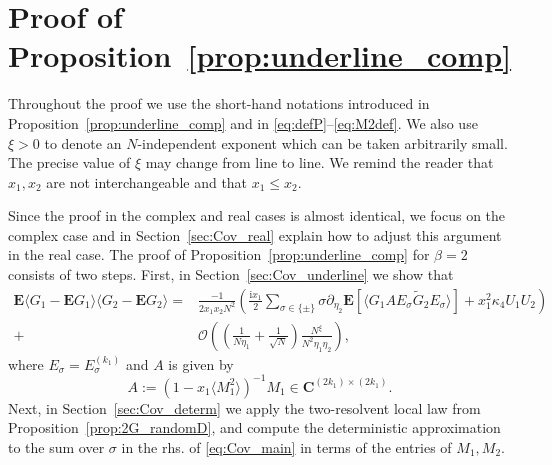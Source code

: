 \documentclass[10pt]{amsart}
\numberwithin{equation}{section}
\newcommand{\E}{\mathbf{E}}
\newcommand{\C}{\mathbf{C}}
\newcommand{\ii}{\mathrm{i}}
\begin{document}
\section{Proof of Proposition~\ref{prop:underline_comp}}
\label{sec:compcov}

Throughout the proof we use the short-hand notations introduced in Proposition~\ref{prop:underline_comp} and in \eqref{eq:defP}--\eqref{eq:M2def}. We also use $\xi>0$ to denote an $N$-independent exponent which can be taken arbitrarily small. The precise value of $\xi$ may change from line to line. We remind the reader that $x_1,x_2$ are not interchangeable and that $x_1\le x_2$.

Since the proof in the complex and real cases is almost identical, we focus on the complex case and in Section~\ref{sec:Cov_real} explain how to adjust this argument in the real case. The proof of Proposition~\ref{prop:underline_comp} for $\beta=2$ consists of two steps. First, in Section~\ref{sec:Cov_underline} we show that
\begin{equation}
\begin{split}
\E \langle G_1-\E G_1\rangle\langle G_2-\E G_2\rangle  = &\frac{-1}{2x_1x_2N^2} \left(\frac{\ii x_1}{2}\sum_{\sigma\in\{\pm\}}\sigma\partial_{\eta_2}\E\left[\langle G_1AE_\sigma \widetilde{G}_2 E_\sigma\rangle\right] + x_1^2\kappa_4 U_1U_2\right)\\
 + &\mathcal{O}\left(\left(\frac{1}{N\eta_1}+\frac{1}{\sqrt{N}}\right)\frac{N^\xi}{N^2\eta_1\eta_2}\right),
\end{split}
\label{eq:Cov_main}
\end{equation}
where $E_\sigma=E_\sigma^{(k_1)}$ and $A$ is given by
\begin{equation}
A:=\left(1-x_1\langle M_1^2\rangle\right)^{-1}M_1\in\C^{(2k_1)\times (2k_1)}.
\label{eq:def_A}
\end{equation}
Next, in Section~\ref{sec:Cov_determ} we apply the two-resolvent local law from Proposition~\ref{prop:2G_randomD}, and compute the deterministic approximation to the sum over $\sigma$ in the rhs. of \eqref{eq:Cov_main} in terms of the entries of $M_1,M_2$.
\end{document}
